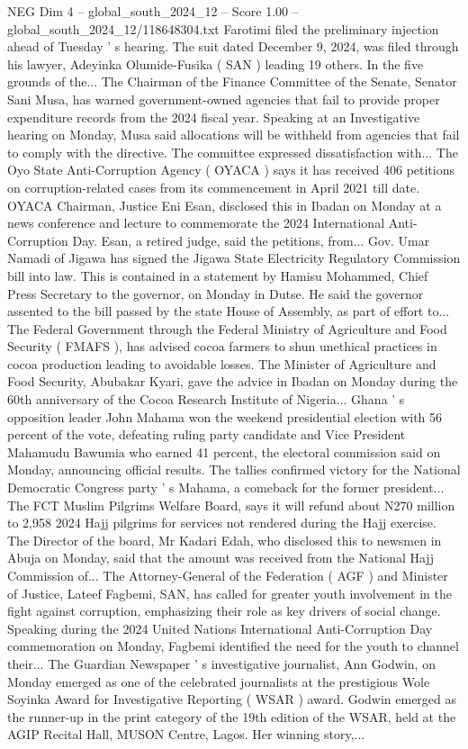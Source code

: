 \begin{textsample}{NEG Dim 4 – global\_south\_2024\_12 – Score 1.00 – global\_south\_2024\_12/118648304.txt}
Farotimi filed the preliminary injection ahead of Tuesday ' s hearing.
The suit dated December 9, 2024, was filed through his lawyer, Adeyinka Olumide-Fusika ( SAN ) leading 19 others.
In the five grounds of the...
The Chairman of the Finance Committee of the Senate, Senator Sani Musa, has warned government-owned agencies that fail to provide proper expenditure records from the 2024 fiscal year.
Speaking at an Investigative hearing on Monday, Musa said allocations will be withheld from agencies that fail to comply with the directive.
The committee expressed dissatisfaction with...
The Oyo State Anti-Corruption Agency ( OYACA ) says it has received 406 petitions on corruption-related cases from its commencement in April 2021 till date.
OYACA Chairman, Justice Eni Esan, disclosed this in Ibadan on Monday at a news conference and lecture to commemorate the 2024 International Anti-Corruption Day.
Esan, a retired judge, said the petitions, from...
Gov.
Umar Namadi of Jigawa has signed the Jigawa State Electricity Regulatory Commission bill into law.
This is contained in a statement by Hamisu Mohammed, Chief Press Secretary to the governor, on Monday in Dutse.
He said the governor assented to the bill passed by the state House of Assembly, as part of effort to...
The Federal Government through the Federal Ministry of Agriculture and Food Security ( FMAFS ), has advised cocoa farmers to shun unethical practices in cocoa production leading to avoidable losses.
The Minister of Agriculture and Food Security, Abubakar Kyari, gave the advice in Ibadan on Monday during the 60th anniversary of the Cocoa Research Institute of Nigeria...
Ghana ' s opposition leader John Mahama won the weekend presidential election with 56 percent of the vote, defeating ruling party candidate and Vice President Mahamudu Bawumia who earned 41 percent, the electoral commission said on Monday, announcing official results.
The tallies confirmed victory for the National Democratic Congress party ' s Mahama, a comeback for the former president...
The FCT Muslim Pilgrims Welfare Board, says it will refund about N270 million to 2,958 2024 Hajj pilgrims for services not rendered during the Hajj exercise.
The Director of the board, Mr Kadari Edah, who disclosed this to newsmen in Abuja on Monday, said that the amount was received from the National Hajj Commission of...
The Attorney-General of the Federation ( AGF ) and Minister of Justice, Lateef Fagbemi, SAN, has called for greater youth involvement in the fight against corruption, emphasizing their role as key drivers of social change.
Speaking during the 2024 United Nations International Anti-Corruption Day commemoration on Monday, Fagbemi identified the need for the youth to channel their...
The Guardian Newspaper ' s investigative journalist, Ann Godwin, on Monday emerged as one of the celebrated journalists at the prestigious Wole Soyinka Award for Investigative Reporting ( WSAR ) award.
Godwin emerged as the runner-up in the print category of the 19th edition of the WSAR, held at the AGIP Recital Hall, MUSON Centre, Lagos.
Her winning story,...

\end{textsample}
